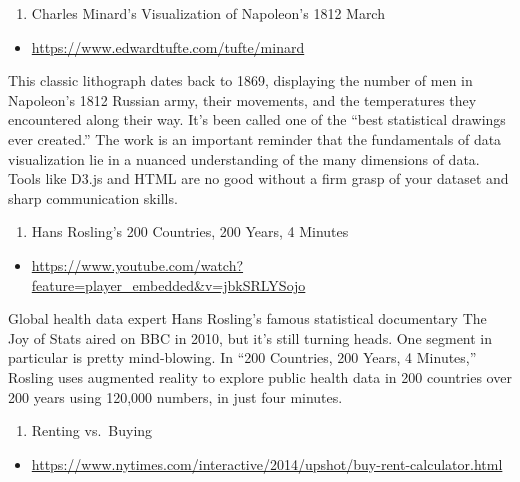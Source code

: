 \documentclass[]{book}
\providecommand{\tightlist}{%
  \setlength{\itemsep}{0pt}\setlength{\parskip}{0pt}}
\theoremstyle{definition}
\theoremstyle{definition}
\theoremstyle{definition}
\theoremstyle{remark}
\begin{document}
\begin{enumerate}
\def\labelenumi{\arabic{enumi}.}
\setcounter{enumi}{2}
\tightlist
\item
  Charles Minard's Visualization of Napoleon's 1812 March
\end{enumerate}

\begin{itemize}
\tightlist
\item
  \url{https://www.edwardtufte.com/tufte/minard}
\end{itemize}

This classic lithograph dates back to 1869, displaying the number of men
in Napoleon's 1812 Russian army, their movements, and the temperatures
they encountered along their way. It's been called one of the ``best
statistical drawings ever created.'' The work is an important reminder
that the fundamentals of data visualization lie in a nuanced
understanding of the many dimensions of data. Tools like D3.js and HTML
are no good without a firm grasp of your dataset and sharp communication
skills.

\begin{enumerate}
\def\labelenumi{\arabic{enumi}.}
\setcounter{enumi}{3}
\tightlist
\item
  Hans Rosling's 200 Countries, 200 Years, 4 Minutes
\end{enumerate}

\begin{itemize}
\tightlist
\item
  \url{https://www.youtube.com/watch?feature=player_embedded\&v=jbkSRLYSojo}
\end{itemize}

Global health data expert Hans Rosling's famous statistical documentary
The Joy of Stats aired on BBC in 2010, but it's still turning heads. One
segment in particular is pretty mind-blowing. In ``200 Countries, 200
Years, 4 Minutes,'' Rosling uses augmented reality to explore public
health data in 200 countries over 200 years using 120,000 numbers, in
just four minutes.

\begin{enumerate}
\def\labelenumi{\arabic{enumi}.}
\setcounter{enumi}{4}
\tightlist
\item
  Renting vs.~Buying
\end{enumerate}

\begin{itemize}
\tightlist
\item
  \url{https://www.nytimes.com/interactive/2014/upshot/buy-rent-calculator.html}
\end{itemize}
\end{document}
